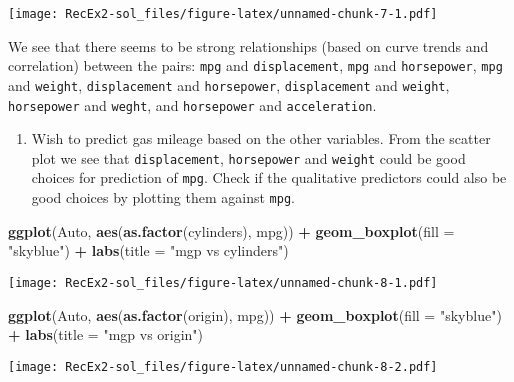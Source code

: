 \documentclass[
]{article}
\newenvironment{Shaded}{\begin{snugshade}}{\end{snugshade}}
\newcommand{\AttributeTok}[1]{\textcolor[rgb]{0.13,0.29,0.53}{#1}}
\newcommand{\FunctionTok}[1]{\textcolor[rgb]{0.13,0.29,0.53}{\textbf{#1}}}
\newcommand{\NormalTok}[1]{#1}
\newcommand{\SpecialCharTok}[1]{\textcolor[rgb]{0.81,0.36,0.00}{\textbf{#1}}}
\newcommand{\StringTok}[1]{\textcolor[rgb]{0.31,0.60,0.02}{#1}}
\providecommand{\tightlist}{%
  \setlength{\itemsep}{0pt}\setlength{\parskip}{0pt}}
\begin{document}
\texttt{[image: RecEx2-sol\_files/figure-latex/unnamed-chunk-7-1.pdf]}

We see that there seems to be strong relationships (based on curve
trends and correlation) between the pairs: \texttt{mpg} and
\texttt{displacement}, \texttt{mpg} and \texttt{horsepower},
\texttt{mpg} and \texttt{weight}, \texttt{displacement} and
\texttt{horsepower}, \texttt{displacement} and \texttt{weight},
\texttt{horsepower} and \texttt{weght}, and \texttt{horsepower} and
\texttt{acceleration}.

\begin{enumerate}
\def\labelenumi{\alph{enumi})}
\setcounter{enumi}{5}
\tightlist
\item
  Wish to predict gas mileage based on the other variables. From the
  scatter plot we see that \texttt{displacement}, \texttt{horsepower}
  and \texttt{weight} could be good choices for prediction of
  \texttt{mpg}. Check if the qualitative predictors could also be good
  choices by plotting them against \texttt{mpg}.
\end{enumerate}

\begin{Shaded}
\begin{Highlighting}[]
\FunctionTok{ggplot}\NormalTok{(Auto, }\FunctionTok{aes}\NormalTok{(}\FunctionTok{as.factor}\NormalTok{(cylinders), mpg)) }\SpecialCharTok{+} 
  \FunctionTok{geom\_boxplot}\NormalTok{(}\AttributeTok{fill =} \StringTok{"skyblue"}\NormalTok{) }\SpecialCharTok{+} 
  \FunctionTok{labs}\NormalTok{(}\AttributeTok{title =} \StringTok{"mgp vs cylinders"}\NormalTok{) }
\end{Highlighting}
\end{Shaded}

\texttt{[image: RecEx2-sol\_files/figure-latex/unnamed-chunk-8-1.pdf]}

\begin{Shaded}
\begin{Highlighting}[]
\FunctionTok{ggplot}\NormalTok{(Auto, }\FunctionTok{aes}\NormalTok{(}\FunctionTok{as.factor}\NormalTok{(origin), mpg)) }\SpecialCharTok{+} 
  \FunctionTok{geom\_boxplot}\NormalTok{(}\AttributeTok{fill =} \StringTok{"skyblue"}\NormalTok{) }\SpecialCharTok{+} 
  \FunctionTok{labs}\NormalTok{(}\AttributeTok{title =} \StringTok{"mgp vs origin"}\NormalTok{) }
\end{Highlighting}
\end{Shaded}

\texttt{[image: RecEx2-sol\_files/figure-latex/unnamed-chunk-8-2.pdf]}
\end{document}
